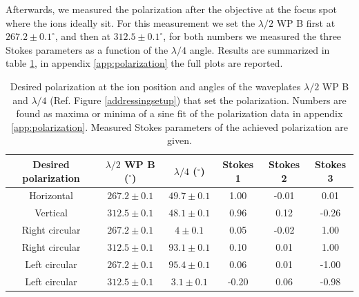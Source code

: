 Afterwards, we measured the polarization after the objective at the focus spot where the ions ideally sit. For this measurement we set the $\lambda/2$ WP B first at $267.2\pm 0.1^\circ$, and then at $312.5\pm0.1^{\circ}$, for both numbers we measured the three Stokes parameters as a function of the $\lambda/4$ angle. Results are summarized in table \ref{polarizationstable}, in appendix \ref{app:polarization} the full plots are reported.
\begin{table}
\centering
\begin{tabular}{c c c c c c}
 \toprule
    {Desired polarization} & {$\lambda/2$ WP B ($^\circ$)} & {$\lambda/4$ ($^\circ$)} & Stokes 1 & Stokes 2 & Stokes 3\\ \midrule\midrule
   Horizontal & $267.2\pm 0.1$ & $49.7\pm0.1$ & 1.00 & -0.01 & 0.01\\
   Vertical   & $312.5\pm0.1$ & $48.1\pm0.1$ &  0.96 &  0.12 & -0.26 \\ \midrule
   Right circular & $267.2\pm 0.1$ & $4\pm 0.1$ &  0.05 & -0.02 & 1.00 \\
   Right circular & $312.5\pm0.1$ & $93.1\pm0.1$ & 0.10 & 0.01 & 1.00  \\\midrule
  Left circular & $267.2\pm 0.1$ & $95.4\pm0.1$ &  0.06 & 0.01 & -1.00  \\
    Left circular & $312.5\pm0.1$  & $3.1\pm0.1$ &  -0.20 & 0.06 & -0.98  \\ \bottomrule
\end{tabular}
\caption{Desired polarization at the ion position and angles of the waveplates $\lambda/2$ WP B and $\lambda/4$ (Ref. Figure \ref{addressingsetup}) that set the polarization. Numbers are found as maxima or minima of a sine fit of the polarization data in appendix \ref{app:polarization}. Measured Stokes parameters of the achieved polarization are given.}
\label{polarizationstable}
\end{table}

